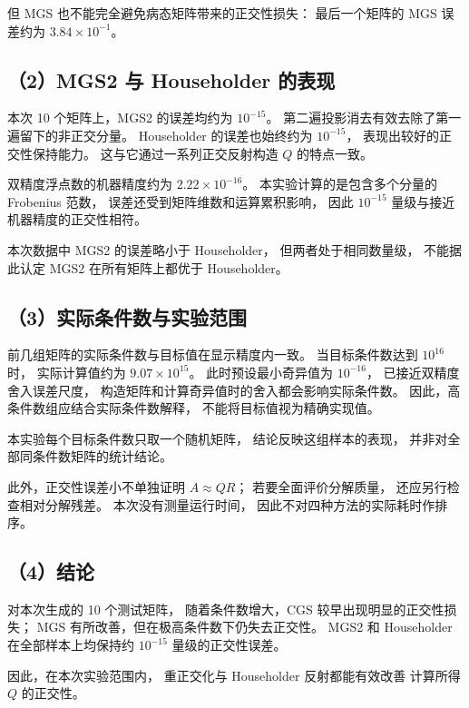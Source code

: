 \documentclass[UTF8,a4paper,11pt,fontset=fandol]{ctexart}
\begin{document}
但 MGS 也不能完全避免病态矩阵带来的正交性损失：
最后一个矩阵的 MGS 误差约为 $3.84\times10^{-1}$。

\subsection*{（2）MGS2 与 Householder 的表现}

本次 10 个矩阵上，MGS2 的误差均约为 $10^{-15}$。
第二遍投影消去有效去除了第一遍留下的非正交分量。
Householder 的误差也始终约为 $10^{-15}$，
表现出较好的正交性保持能力。
这与它通过一系列正交反射构造 $Q$ 的特点一致。

双精度浮点数的机器精度约为 $2.22\times10^{-16}$。
本实验计算的是包含多个分量的 Frobenius 范数，
误差还受到矩阵维数和运算累积影响，
因此 $10^{-15}$ 量级与接近机器精度的正交性相符。

本次数据中 MGS2 的误差略小于 Householder，
但两者处于相同数量级，
不能据此认定 MGS2 在所有矩阵上都优于 Householder。

\subsection*{（3）实际条件数与实验范围}

前几组矩阵的实际条件数与目标值在显示精度内一致。
当目标条件数达到 $10^{16}$ 时，
实际计算值约为 $9.07\times10^{15}$。
此时预设最小奇异值为 $10^{-16}$，
已接近双精度舍入误差尺度，
构造矩阵和计算奇异值时的舍入都会影响实际条件数。
因此，高条件数组应结合实际条件数解释，
不能将目标值视为精确实现值。

本实验每个目标条件数只取一个随机矩阵，
结论反映这组样本的表现，
并非对全部同条件数矩阵的统计结论。

此外，正交性误差小不单独证明 $A\approx QR$；
若要全面评价分解质量，
还应另行检查相对分解残差。
本次没有测量运行时间，
因此不对四种方法的实际耗时作排序。

\subsection*{（4）结论}

对本次生成的 10 个测试矩阵，
随着条件数增大，CGS 较早出现明显的正交性损失；
MGS 有所改善，但在极高条件数下仍失去正交性。
MGS2 和 Householder 在全部样本上均保持约
$10^{-15}$ 量级的正交性误差。

因此，在本次实验范围内，
重正交化与 Householder 反射都能有效改善
计算所得 $Q$ 的正交性。
\end{document}
